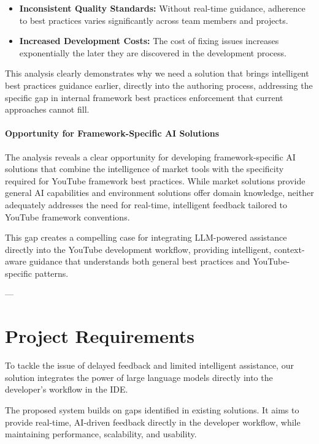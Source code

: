 \begin{spacing}{1.2}
\begin{itemize}
    \item \textbf{Inconsistent Quality Standards:} Without real-time guidance, adherence to best practices varies significantly across team members and projects.
    
    \item \textbf{Increased Development Costs:} The cost of fixing issues increases exponentially the later they are discovered in the development process.
\end{itemize}

This analysis clearly demonstrates why we need a solution that brings intelligent best practices guidance earlier, directly into the authoring process, addressing the specific gap in internal framework best practices enforcement that current approaches cannot fill.




\paragraph{Opportunity for Framework-Specific AI Solutions}

The analysis reveals a clear opportunity for developing framework-specific AI solutions that combine the intelligence of market tools with the specificity required for YouTube framework best practices. While market solutions provide general AI capabilities and environment solutions offer domain knowledge, neither adequately addresses the need for real-time, intelligent feedback tailored to YouTube framework conventions.

This gap creates a compelling case for integrating LLM-powered assistance directly into the YouTube development workflow, providing intelligent, context-aware guidance that understands both general best practices and YouTube-specific patterns.

---

\section{Project Requirements}

To tackle the issue of delayed feedback and limited intelligent assistance, our solution integrates the power of large language models directly into the developer's workflow in the IDE.

The proposed system builds on gaps identified in existing solutions. It aims to provide real-time, AI-driven feedback directly in the developer workflow, while maintaining performance, scalability, and usability.


\end{spacing}
